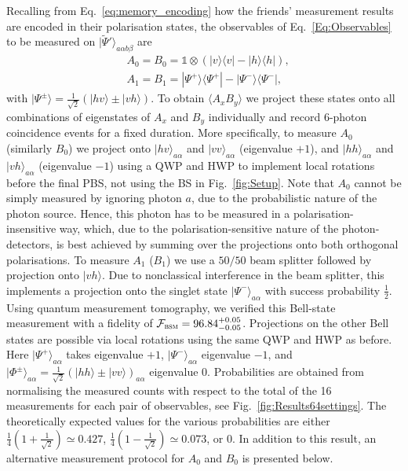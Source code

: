 \documentclass[aps,floatfix,superscriptaddress,twocolumn,tightenlines,amsmath,amssymb,nofootinbib,10pt]{revtex4-1}
\newcommand{\ket}[1] {| #1 \rangle}
\newcommand{\ketbra}[1]{ | #1 \rangle\!\langle #1 |}
\newcommand{\id}{\mathds{1}}
\begin{document}
Recalling from Eq.~\eqref{eq:memory_encoding} how the friends' measurement results are encoded in their polarisation states, the observables of Eq.~\eqref{Eq:Observables} to be measured on $\ket{\tilde \Psi'}_{a \alpha b \beta}$ are
\begin{align}
&A_0 = B_0 = \id \otimes (\ketbra{v}-\ketbra{h}), \nonumber\\
&A_1 = B_1 = \ketbra{\Psi^+} - \ketbra{\Psi^-},
\label{Eq:Observables_v2}
\end{align}
with $\ket{\Psi^\pm} = \frac{1}{\sqrt{2}}(\ket{hv}\pm\ket{vh})$.
To obtain $\langle A_xB_y \rangle$ we project these states onto all combinations of eigenstates of $A_x$ and $B_y$ individually and record 6-photon coincidence events for a  fixed duration. More specifically, to measure $A_0$ (similarly $B_0$) we project onto $\ket{hv}_{a \alpha}$ and $\ket{vv}_{a \alpha}$ (eigenvalue $+1$), and $\ket{hh}_{a \alpha}$ and $\ket{vh}_{a \alpha}$ (eigenvalue $-1$) using a QWP and HWP to implement local rotations before the final PBS, not using the BS in Fig.~\ref{fig:Setup}. Note that $A_0$ cannot be simply measured by ignoring photon $a$, due to the probabilistic nature of the photon source. Hence, this photon has to be measured in a polarisation-insensitive way, which, due to the polarisation-sensitive nature of the photon-detectors, is best achieved by summing over the projections onto both orthogonal polarisations.
To measure $A_1$ ($B_1$) we use a $50/50$ beam splitter followed by projection onto $\ket{vh}$. Due to nonclassical interference in the beam splitter, this implements a projection onto the singlet state $\ket{\Psi^-}_{a \alpha}$ with success probability $\frac 1 2$. Using quantum measurement tomography, we verified this Bell-state measurement with a fidelity of $\mathcal{F}_{\textsc{bsm}}=96.84^{+0.05}_{-0.05}$. Projections on the other Bell states are possible via local rotations using the same QWP and HWP as before. Here $\ket{\Psi^+}_{a \alpha}$ takes eigenvalue $+1$, $\ket{\Psi^-}_{a \alpha}$ eigenvalue $-1$, and $\ket{\Phi^\pm}_{a \alpha}= \frac{1}{\sqrt{2}}(\ket{hh}\pm\ket{vv})_{a \alpha}$ eigenvalue $0$.
Probabilities are obtained from normalising the measured counts with respect to the total of the 16 measurements for each pair of observables, see Fig.~\ref{fig:Results64settings}. The theoretically expected values for the various probabilities are either $\frac{1}{4}(1+\frac{1}{\sqrt{2}}) \simeq 0.427$, $\frac{1}{4}(1-\frac{1}{\sqrt{2}}) \simeq 0.073$, or $0$. In addition to this result, an alternative measurement protocol for $A_0$ and $B_0$ is presented below. 
\end{document}
